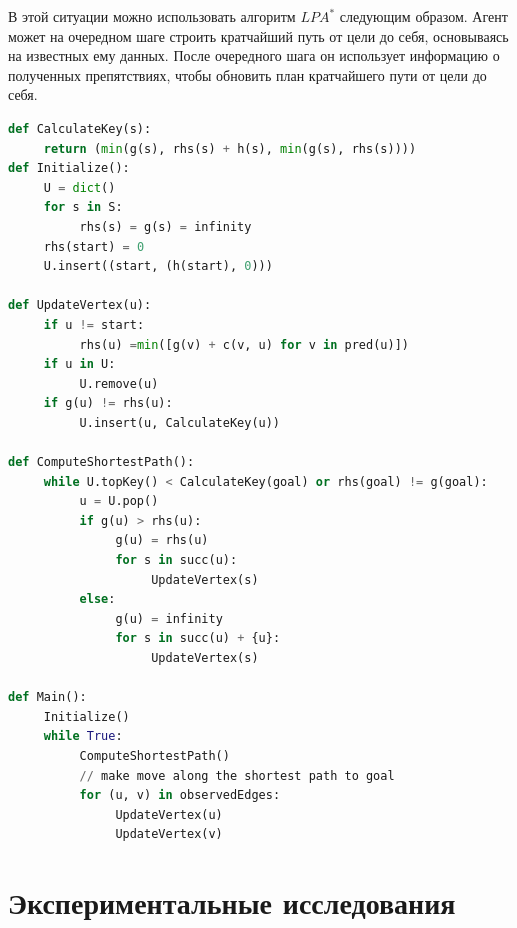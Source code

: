 \documentclass[11pt]{article}
\begin{document}
    В этой ситуации можно использовать алгоритм $LPA^*$ следующим образом.
    Агент может на очередном шаге строить кратчайший путь от цели до себя, основываясь на известных ему данных.
    После очередного шага он использует информацию о полученных препятствиях, чтобы обновить план кратчайшего пути от цели до себя.

    \begin{lstlisting}[language=Python, caption=D* lite ]
def CalculateKey(s):
     return (min(g(s), rhs(s) + h(s), min(g(s), rhs(s))))
def Initialize():
     U = dict()
     for s in S:
          rhs(s) = g(s) = infinity
     rhs(start) = 0
     U.insert((start, (h(start), 0)))

def UpdateVertex(u):
     if u != start:
          rhs(u) =min([g(v) + c(v, u) for v in pred(u)])
     if u in U:
          U.remove(u)
     if g(u) != rhs(u):
          U.insert(u, CalculateKey(u))

def ComputeShortestPath():
     while U.topKey() < CalculateKey(goal) or rhs(goal) != g(goal):
          u = U.pop()
          if g(u) > rhs(u):
               g(u) = rhs(u)
               for s in succ(u):
                    UpdateVertex(s)
          else:
               g(u) = infinity
               for s in succ(u) + {u}:
                    UpdateVertex(s)

def Main():
     Initialize()
     while True:
          ComputeShortestPath()
          // make move along the shortest path to goal
          for (u, v) in observedEdges:
               UpdateVertex(u)
               UpdateVertex(v)
    \end{lstlisting}


    \section{Экспериментальные исследования}
\end{document}
